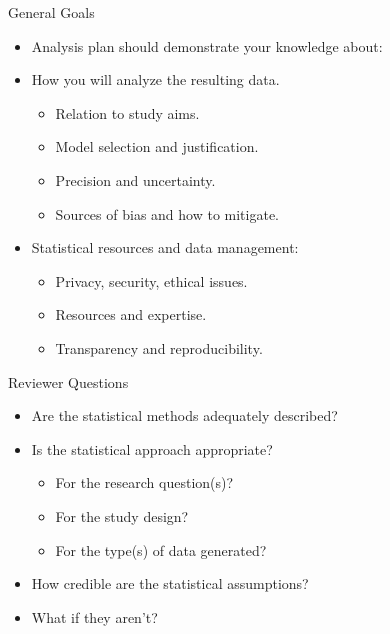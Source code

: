 \documentclass[ignorenonframetext,]{beamer}
\providecommand{\tightlist}{%
  \setlength{\itemsep}{0pt}\setlength{\parskip}{0pt}}
\begin{document}
\begin{frame}{General Goals}
\protect\hypertarget{general-goals-1}{}

\begin{itemize}
\item
  Analysis plan should demonstrate your knowledge about:
\item
  How you will analyze the resulting data.

  \begin{itemize}
  \tightlist
  \item
    Relation to study aims.
  \item
    Model selection and justification.
  \item
    Precision and uncertainty.
  \item
    Sources of bias and how to mitigate.
  \end{itemize}
\item
  Statistical resources and data management:

  \begin{itemize}
  \tightlist
  \item
    Privacy, security, ethical issues.
  \item
    Resources and expertise.
  \item
    Transparency and reproducibility.
  \end{itemize}
\end{itemize}

\end{frame}

\begin{frame}{Reviewer Questions}
\protect\hypertarget{reviewer-questions}{}

\begin{itemize}
\item
  Are the statistical methods adequately described?
\item
  Is the statistical approach appropriate?

  \begin{itemize}
  \tightlist
  \item
    For the research question(s)?
  \item
    For the study design?
  \item
    For the type(s) of data generated?
  \end{itemize}
\item
  How credible are the statistical assumptions?
\item
  What if they aren't?
\end{itemize}

\end{frame}
\end{document}
